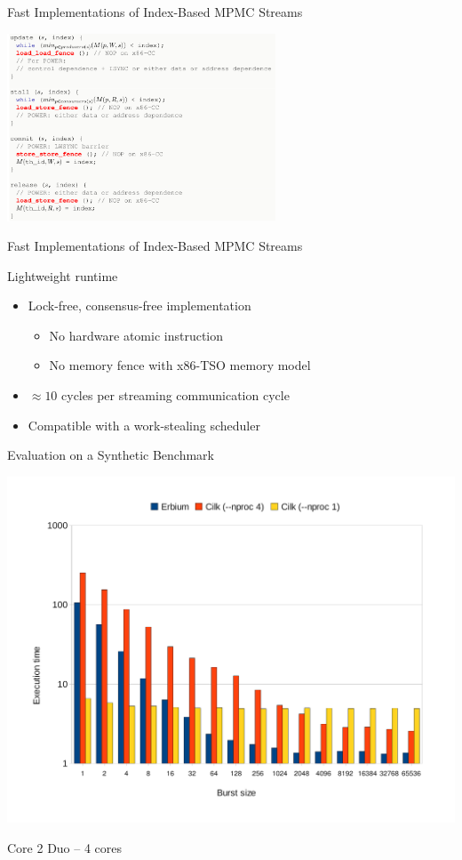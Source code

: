 \documentclass[xcolor=dvipsnames,9pt,mathserif]{beamer}
\begin{document}
\begin{frame}[t]{Fast Implementations of Index-Based MPMC Streams}
  \centerline{\scalebox{.6}{}}

  \bigskip
  \centerline{\includegraphics[width=8cm]{erbium_fences}}
\end{frame}

\begin{frame}[t]{Fast Implementations of Index-Based MPMC Streams}
  \centerline{\scalebox{.6}{}}

  \begin{block}{Lightweight runtime}
    \begin{itemize}
    \item Lock-free, consensus-free implementation
      \begin{itemize}
      \item No hardware atomic instruction
      \item No memory fence with x86-TSO memory model
      \end{itemize}
    \item $\approx10$ cycles per streaming communication cycle
    \item Compatible with a work-stealing scheduler
    \end{itemize}
  \end{block}
\end{frame}

\begin{frame}[fragile]{Evaluation on a Synthetic Benchmark}
  \begin{center}
    \includegraphics[width=.8\columnwidth]{exploration_cilk}

    \medskip
    Core 2 Duo -- 4 cores
  \end{center}
\end{frame}
\end{document}
